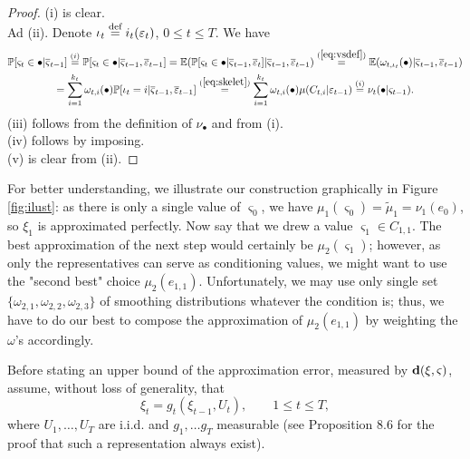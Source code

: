 \documentclass{article}              %
\newcommand{\tbd}[1]{{ \bf [ TBD #1 ]}}
\begin{document}
\begin{proof}
(i) is clear.\\
Ad (ii). Denote 
$\iota_{t}\stackrel{\text{\rm def}}{=} i_{t}(\varepsilon_{t})$, $0\leq t\leq T.$
We have
\begin{multline*}
\mathbb{P}[\varsigma_{t}\in\bullet|\overline{\varsigma}_{t-1}]\stackrel{(i)}{=}\mathbb{P}[\varsigma_{t}\in\bullet|\overline{\varsigma}_{t-1},\overline{\varepsilon}_{t-1}]=\mathbb{E}(\mathbb{P}[\varsigma_{t}\in\bullet|\overline{\varsigma}_{t-1},\overline{\varepsilon}_{t}]|\overline{\varsigma}_{t-1},\overline{\varepsilon}_{t-1})
\stackrel{(\ref{eq:vsdef})}{=}\mathbb{E}(\omega_{t,\iota_{t}}(\bullet)|\overline{\varsigma}_{t-1},\overline{\varepsilon}_{t-1})
\\
=\sum_{i=1}^{k_{t}}\omega_{t,i}(\bullet)\mathbb{P}[\iota_{t}=i|\overline{\varsigma}_{t-1},\overline{\varepsilon}_{t-1}]
\stackrel{(\ref{eq:skelet})}{=}
\sum_{i=1}^{k_{t}}\omega_{t,i}(\bullet)\mu(C_{t,i}|\varepsilon_{t-1})
\stackrel{(i)}{=}\nu_{t}(\bullet|\varsigma_{t-1}).
\end{multline*}
(iii) follows from the definition of $\nu_{\bullet}$ and from (i).\\
(iv) follows by imposing. \\
(v) is clear from (ii). 
\end{proof}
\noindent For better understanding, we illustrate our construction graphically
in Figure \ref{fig:ilust}: as there is only a single value of $\varsigma_{0}$, we
have $\mu_1(\varsigma_{0})=\tilde \mu_1=\nu_1(e_0)$, so $\xi_{1}$ is approximated
perfectly. Now say that we drew a value $\varsigma_1\in C_{1,1}$. The best approximation of the next step would certainly be $\mu_2(\varsigma_1)$; however, as only the representatives can serve as conditioning values, we might want to use the "second best" choice $\mu_2(e_{1,1})$. Unfortunately, we may use only single set $\{\omega_{2,1},\omega_{2,2},\omega_{2,3}\}$ of smoothing distributions whatever the condition is; thus, we have to do our best to compose the approximation of $\mu_2(e_{1,1})$ by weighting the $\omega$'s accordingly.

Before stating an upper bound of the approximation error, measured
by $\mathbf{d}(\xi,\varsigma)$, assume, without loss of generality, that
\begin{equation}
\xi_{t}=g_{t}(\xi_{t-1},U_{t}),\qquad1\leq t\leq T,\label{eq:xxu}
\end{equation}
where $U_{1},\dots,U_{T}$ are i.i.d. and $g_{1},\dots g_{T}$ measurable (see \cite{Kallenberg02} Proposition
8.6 for the proof that such a representation always exist).
\end{document}
